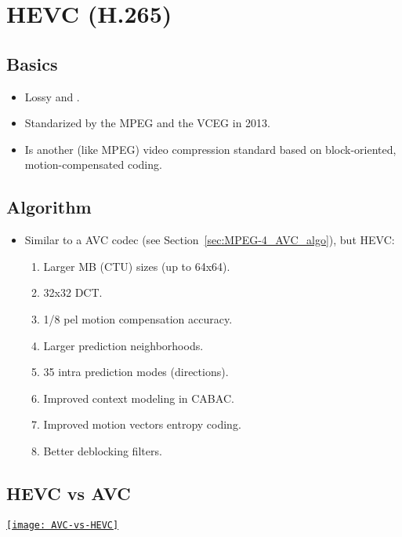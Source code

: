 \chapter{\gls{HEVC} (H.265)}
\label{cha:HEVC}

\section{Basics}
\begin{itemize}
\item Lossy and .
\item Standarized by the \gls{MPEG} and the \gls{VCEG} in 2013.
\item Is another (like \gls{MPEG}) video compression standard based on
  block-oriented, motion-compensated coding.
\end{itemize}

\section{Algorithm}
\label{sec:HEVC_algo}
\begin{itemize}
\item Similar to a \gls{AVC} codec (see Section~\ref{sec:MPEG-4_AVC_algo}),
  but \gls{HEVC}:
\begin{enumerate}
\item Larger MB (\gls{CTU}) sizes (up to 64x64).
\item 32x32 \gls{DCT}.
\item 1/8 pel motion compensation accuracy.
\item Larger prediction neighborhoods.
\item 35 intra prediction modes (directions).
\item Improved context modeling in \gls{CABAC}.
\item Improved motion vectors entropy coding.
\item Better deblocking filters.
\end{enumerate}
\end{itemize}

\section{HEVC vs AVC}
\begin{center}
  \href{https://www.epiphan.com/blog/h264-vs-h265/}{\texttt{[image: AVC-vs-HEVC]}}
\end{center}
